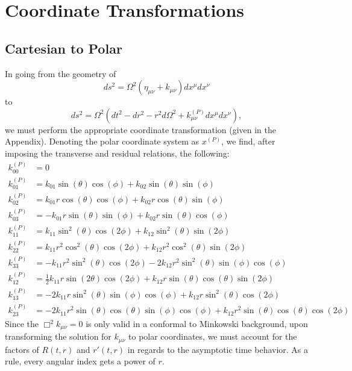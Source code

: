 \documentclass[10pt,letterpaper]{article}
\begin{document}
\section*{Coordinate Transformations}
\subsection*{Cartesian to Polar}
In going from the geometry of 
\begin{equation}
ds^2 = \Omega^2 (\eta_{\mu\nu}+k_{\mu\nu})dx^\mu dx^\nu
\end{equation}
to
\begin{equation}
ds^2 = \Omega^2 (dt^2-dr^2 - r^2 d\Omega^2+ k^{(P)}_{\mu\nu}dx^\mu dx^\nu),
\end{equation}
we must perform the appropriate coordinate transformation (given in the Appendix). Denoting the polar coordinate system as $x^{(P)}$, we find, after imposing the transverse and residual relations, the following:
\begin{align}
k^{(P)}_{00} &= 0\nonumber\\
k^{(P)}_{01} &= k_{01} \sin (\theta ) \cos (\phi )+k_{02} \sin (\theta ) \sin (\phi )\nonumber\\
k^{(P)}_{02} &= k_{01} r \cos (\theta ) \cos (\phi )+k_{02} r \cos (\theta ) \sin (\phi )\nonumber\\
k^{(P)}_{03} &= -k_{01} r \sin (\theta ) \sin (\phi )+k_{02} r \sin (\theta ) \cos (\phi )\nonumber\\
k^{(P)}_{11} &= k_{11} \sin ^2(\theta ) \cos (2 \phi )+k_{12} \sin ^2(\theta ) \sin (2 \phi )\nonumber\\
k^{(P)}_{22} &= k_{11} r^2 \cos ^2(\theta ) \cos (2 \phi )+k_{12} r^2 \cos ^2(\theta ) \sin (2 \phi )\nonumber\\
k^{(P)}_{33} &= -k_{11} r^2 \sin ^2(\theta ) \cos (2 \phi )-2 k_{12} r^2 \sin ^2(\theta ) \sin (\phi ) \cos (\phi )\nonumber\\
k^{(P)}_{12} &= \frac{1}{2} k_{11} r \sin (2 \theta ) \cos (2 \phi )+k_{12} r \sin (\theta ) \cos (\theta ) \sin (2 \phi )\nonumber\\
k^{(P)}_{13} &=-2 k_{11} r \sin ^2(\theta ) \sin (\phi ) \cos (\phi )+ k_{12} r \sin ^2(\theta ) \cos (2 \phi )\nonumber\\
k^{(P)}_{23} &= -2 k_{11} r^2 \sin (\theta ) \cos (\theta ) \sin (\phi ) \cos (\phi )+k_{12} r^2 \sin (\theta ) \cos (\theta ) \cos (2 \phi )
\end{align}
Since the $\Box^2 k_{\mu\nu} =0$ is only valid in a conformal to Minkowski background, upon transforming the solution for $k_{\mu\nu}$ to polar coordinates, we must account for the factors of $R(t,r)$ and $r'(t,r)$ in regards to the asymptotic time behavior. As a rule, every angular index gets a power of $r$. 
\end{document}

